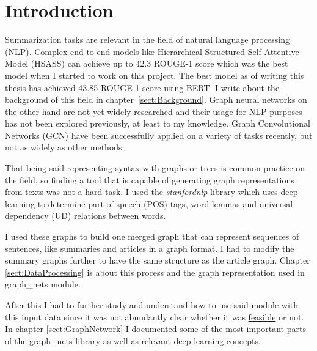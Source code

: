\chapter*{Introduction}\label{sect:Introduction}

Summarization tasks are relevant in the field of natural language processing (NLP). Complex end-to-end models like Hierarchical Structured Self-Attentive Model (HSASS) \cite{HSSAS} can achieve up to 42.3 ROUGE-1 score which was the best model when I started to work on this project. The best model as of writing this thesis has achieved 43.85 ROUGE-1 score \cite{BERTsum} using BERT. I write about the background of this field in chapter~\ref{sect:Background}.
Graph neural networks on the other hand are not yet widely researched and their usage for NLP purposes has not been explored previously, at least to my knowledge. Graph Convolutional Networks (GCN) have been successfully applied on a variety of tasks recently, but not as widely as other methods.

That being said representing syntax with graphs or trees is common practice on the field, so finding a tool that is capable of generating graph representations from texts was not a hard task. I used the \textit{stanfordnlp} library which uses deep learning to determine part of speech (POS) tags, word lemmas and universal dependency (UD) relations between words.

I used these graphs to build one merged graph that can represent sequences of sentences, like summaries and articles in a graph format. I had to modify the summary graphs further to have the same structure as the article graph. Chapter \ref{sect:DataProcessing} is about this process and the graph representation used in graph\_nets module.

After this I had to further study and understand how to use said module with this input data since it was not abundantly clear whether it was \href{https://github.com/deepmind/graph\_nets/issues/36}{feasible} or not. In chapter \ref{sect:GraphNetwork} I documented some of the most important parts of the graph\_nets library as well as relevant deep learning concepts.

